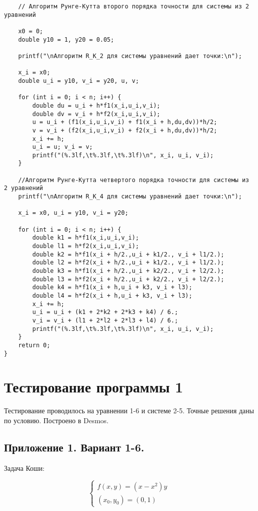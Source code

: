 \documentclass[a4paper,12pt,titlepage,finall]{article}
\begin{document}
\begin{lstlisting}
	// Алгоритм Рунге-Кутта второго порядка точности для системы из 2 уравнений
	
	x0 = 0;
	double y10 = 1, y20 = 0.05;
	
	printf("\nАлгоритм R_K_2 для системы уравнений дает точки:\n");
	
	x_i = x0;
	double u_i = y10, v_i = y20, u, v;

	for (int i = 0; i < n; i++) {
		double du = u_i + h*f1(x_i,u_i,v_i);
		double dv = v_i + h*f2(x_i,u_i,v_i);
		u = u_i + (f1(x_i,u_i,v_i) + f1(x_i + h,du,dv))*h/2;
		v = v_i + (f2(x_i,u_i,v_i) + f2(x_i + h,du,dv))*h/2;
		x_i += h;
		u_i = u; v_i = v;
		printf("(%.3lf,\t%.3lf,\t%.3lf)\n", x_i, u_i, v_i);
	}

	//Алгоритм Рунге-Кутта четвертого порядка точности для системы из 2 уравнений
	printf("\nАлгоритм R_K_4 для системы уравнений дает точки:\n");

	x_i = x0, u_i = y10, v_i = y20;
	
	for (int i = 0; i < n; i++) {
		double k1 = h*f1(x_i,u_i,v_i);
		double l1 = h*f2(x_i,u_i,v_i);
		double k2 = h*f1(x_i + h/2.,u_i + k1/2., v_i + l1/2.);
		double l2 = h*f2(x_i + h/2.,u_i + k1/2., v_i + l1/2.);
		double k3 = h*f1(x_i + h/2.,u_i + k2/2., v_i + l2/2.);
		double l3 = h*f2(x_i + h/2.,u_i + k2/2., v_i + l2/2.);
		double k4 = h*f1(x_i + h,u_i + k3, v_i + l3);
		double l4 = h*f2(x_i + h,u_i + k3, v_i + l3);
		x_i += h;
		u_i = u_i + (k1 + 2*k2 + 2*k3 + k4) / 6.;
		v_i = v_i + (l1 + 2*l2 + 2*l3 + l4) / 6.;
		printf("(%.3lf,\t%.3lf,\t%.3lf)\n", x_i, u_i, v_i);
	}
	return 0;
}

\end{lstlisting}

\newpage

\section{Тестирование программы 1}

Тестирование проводилось на уравнении 1-6 и системе 2-5. Точные решения даны по условию. Построено в Desmos.

\subsection{Приложение 1. Вариант 1-6.}

Задача Коши:

\begin{equation*}
 \begin{cases}
   f(x, y) = (x - x^{2})y
   \\
   (x_{0},y_{0}) = (0,1)
 \end{cases}
\end{equation*}
\end{document}
